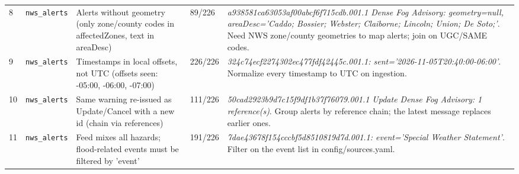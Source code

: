 {\begin{longtable}{@{}>{\raggedright}p{0.4cm}>{\raggedright}p{2.5cm}>{\raggedright}p{4.2cm}>{\raggedright}p{1.5cm}p{6.2cm}@{}}
8 & \texttt{nws\_\allowbreak alerts} & Alerts without geometry (only zone/county codes in affectedZones, text in areaDesc) & 89/226 & \textit{a938581ca63053af00abcf6f715cdb.001.1 Dense Fog Advisory: geometry=null, areaDesc='Caddo; Bossier; Webster; Claiborne; Lincoln; Union; De Soto;'}. Need NWS zone/county geometries to map alerts; join on UGC/SAME codes.\\
9 & \texttt{nws\_\allowbreak alerts} & Timestamps in local offsets, not UTC (offsets seen: -05:00, -06:00, -07:00) & 226/226 & \textit{324c74ecf2274302ec477fdf42445c.001.1: sent='2026-11-05T20:40:00-06:00'}. Normalize every timestamp to UTC on ingestion.\\
10 & \texttt{nws\_\allowbreak alerts} & Same warning re-issued as Update/Cancel with a new id (chain via references) & 111/226 & \textit{50cad2923b9d7c15f9df1b37f76079.001.1 Update Dense Fog Advisory: 1 reference(s)}. Group alerts by reference chain; the latest message replaces earlier ones.\\
11 & \texttt{nws\_\allowbreak alerts} & Feed mixes all hazards; flood-related events must be filtered by 'event' & 191/226 & \textit{7dae43678f154cccbf5d8510819d7d.001.1: event='Special Weather Statement'}. Filter on the event list in config/sources.yaml.\\
\bottomrule
\end{longtable}
}